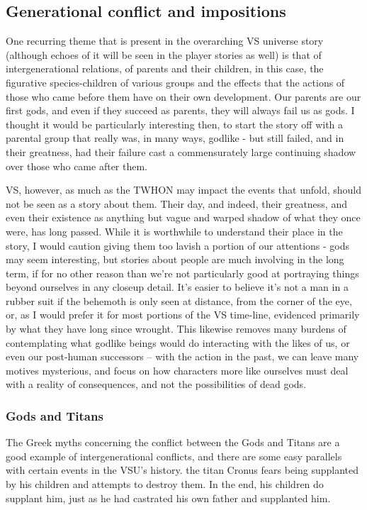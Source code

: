 \subsection{Generational conflict and impositions}
One recurring theme that is present in the overarching VS universe
story (although echoes of it will be seen in the player stories as
well) is that of intergenerational relations, of parents and their
children, in this case, the figurative species-children of various
groups and the effects that the actions of those who came before them
have on their own development. Our parents are our first gods, and
even if they succeed as parents, they will always fail us as gods. I
thought it would be particularly interesting then, to start the story
off with a parental group that really was, in many ways, godlike - but
still failed, and in their greatness, had their failure cast a
commensurately large continuing shadow over those who came after them.

VS, however, as much as the TWHON may impact the events that unfold,
should not be seen as a story about them. Their day, and indeed, their
greatness, and even their existence as anything but vague and warped
shadow of what they once were, has long passed. While it is worthwhile
to understand their place in the story, I would caution giving them
too lavish a portion of our attentions - gods may seem interesting,
but stories about people are much involving in the long term, if for
no other reason than we're not particularly good at portraying things
beyond ourselves in any closeup detail. It's easier to believe it's
not a man in a rubber suit if the behemoth is only seen at distance,
from the corner of the eye, or, as I would prefer it for most portions
of the VS time-line, evidenced primarily by what they have long since
wrought. This likewise removes many burdens of contemplating what
godlike beings would do interacting with the likes of us, or even our
post-human successors -- with the action in the past, we can leave
many motives mysterious, and focus on how characters more like
ourselves must deal with a reality of consequences, and not the
possibilities of dead gods.

\subsubsection{Gods and Titans}

The Greek myths concerning the conflict between the Gods and Titans
are a good example of intergenerational conflicts, and there are some
easy parallels with certain events in the VSU's history. the titan
Cronus fears being supplanted by his children and attempts to destroy
them. In the end, his children do supplant him, just as he had
castrated his own father and supplanted him.

